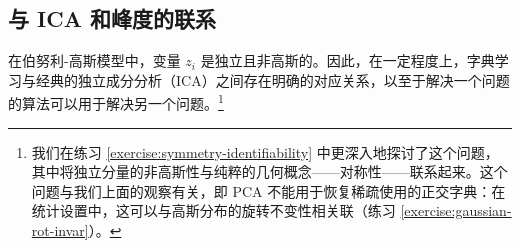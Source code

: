 \documentclass[../../book-main.tex]{subfiles}
\begin{document}

%
%
%
%

\subsection{与 ICA 和峰度的联系}
在伯努利-高斯模型中，变量 $z_i$ 是独立且非高斯的。因此，在一定程度上，字典学习与经典的独立成分分析（ICA）之间存在明确的对应关系，以至于解决一个问题的算法可以用于解决另一个问题。\footnote{我们在练习 \ref{exercise:symmetry-identifiability} 中更深入地探讨了这个问题，其中将独立分量的非高斯性与纯粹的几何概念——对称性——联系起来。这个问题与我们上面的观察有关，即 PCA 不能用于恢复稀疏使用的正交字典：在统计设置中，这可以与高斯分布的旋转不变性相关联（练习 \ref{exercise:gaussian-rot-invar}）。}
\end{document}

